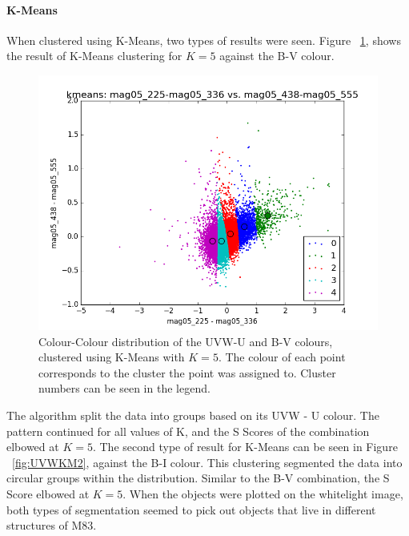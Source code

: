 \paragraph{K-Means}

When clustered using K-Means, two types of results were seen.
Figure ~\ref{fig:UVWKM1}, shows the result of K-Means clustering for $K=5$ against the B-V colour. 
\begin{figure}[H]
\centering
\includegraphics[width=\linewidth]{figs/kmeans_xy_5cl_mag05_225-mag05_336vsmag05_438-mag05_555}
\caption{Colour-Colour distribution of the UVW-U and B-V colours, clustered using K-Means with $K=5$. The colour of each point corresponds to the cluster the point was assigned to. Cluster numbers can be seen in the legend.}
\label{fig:UVWKM1}
\end{figure}
The algorithm split the data into groups based on its UVW - U colour. The pattern continued for all values of K, and the S Scores of the combination elbowed at $K=5$.
The second type of result for K-Means can be seen in Figure ~\ref{fig:UVWKM2}, against the B-I colour. 
This clustering segmented the data into circular groups within the distribution. 
Similar to the B-V combination, the S Score elbowed at $K=5$. 
When the objects were plotted on the whitelight image, both types of segmentation seemed to pick out objects that live in different structures of M83. %
